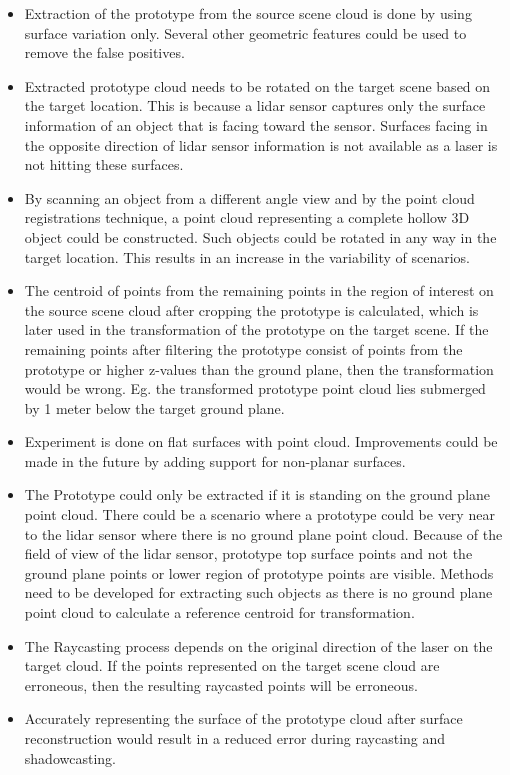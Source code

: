 \begin{itemize}
    \item Extraction of the prototype from the source scene cloud is done by using surface variation only. Several other geometric features could be used to remove the false positives.
    \item Extracted prototype cloud needs to be rotated on the target scene based on the target location. This is because a lidar sensor captures only the surface information of an object that is facing toward the sensor. Surfaces facing in the opposite direction of lidar sensor information is not available as a laser is not hitting these surfaces.
    \item By scanning an object from a different angle view and by the point cloud registrations technique, a point cloud representing a complete hollow 3D object could be constructed. Such objects could be rotated in any way in the target location. This results in an increase in the variability of scenarios.
    \item The centroid of points from the remaining points in the region of interest on the source scene cloud after cropping the prototype is calculated, which is later used in the transformation of the prototype on the target scene. If the remaining points after filtering the prototype consist of points from the prototype or higher z-values than the ground plane, then the transformation would be wrong. Eg. the transformed prototype point cloud lies submerged by 1 meter below the target ground plane.
    \item Experiment is done on flat surfaces with point cloud. Improvements could be made in the future by adding support for non-planar surfaces.
    \item The Prototype could only be extracted if it is standing on the ground plane point cloud. There could be a scenario where a prototype could be very near to the lidar sensor where there is no ground plane point cloud. Because of the field of view of the lidar sensor, prototype top surface points and not the ground plane points or lower region of prototype points are visible. Methods need to be developed for extracting such objects as there is no ground plane point cloud to calculate a reference centroid for transformation.
    \item The Raycasting process depends on the original direction of the laser on the target cloud. If the points represented on the target scene cloud are erroneous, then the resulting raycasted points will be erroneous.
    \item Accurately representing the surface of the prototype cloud after surface reconstruction would result in a reduced error during raycasting and shadowcasting.

\end{itemize}
